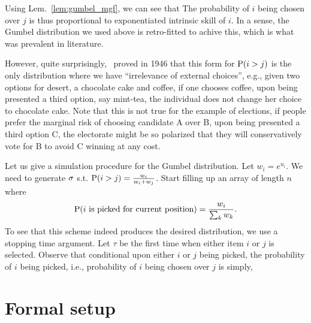 \documentclass[letterpaper, 11pt, reqno]{amsart}
\begin{document}
Using Lem.~\ref{lem:gumbel_mgf}, we can see that
The probability of $i$ being chosen over $j$ is thus proportional to exponentiated intrinsic skill of $i$. In a sense, the Gumbel distribution we used above is retro-fitted to achive this, which is what was prevalent in literature.

However, quite surprisingly,~\cite{luce2012individual} proved in 1946 that this form for $\P(i > j)$ is the only distribution where we have ``irrelevance of external choices'', e.g., given two options for desert, a chocolate cake and coffee, if one chooses coffee, upon being presented a third option, say mint-tea, the individual does not change her choice to chocolate cake. Note that this is not true for the example of elections, if people prefer the marginal risk of choosing candidate A over B, upon being presented a third option C, the electorate might be so polarized that they will conservatively vote for B to avoid C winning at any cost.

Let us give a simulation procedure for the Gumbel distribution. Let $w_i = e^{u_i}$. We need to generate $\s$ s.t. $\P(i > j) = \f{w_i}{w_i + w_j}$. Start filling up an array of length $n$ where
$$
\P(i \trm{ is picked for current position} ) = \f{w_i}{\sum_k w_k}.
$$
To see that this scheme indeed produces the desired distribution, we use a stopping time argument. Let $\tau$ be the first time when either item $i$ or $j$ is selected. Observe that conditional upon either $i$ or $j$ being picked, the probability of $i$ being picked, i.e., probability of $i$ being chosen over $j$ is simply,

\section{Formal setup}
\end{document}

